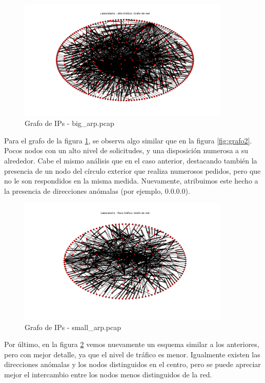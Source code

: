 \begin{figure}[H]
  \centering
    \includegraphics[width=0.9\textwidth]{graficos/grafoLaboBig.png}
    \caption{Grafo de IPs - big\_arp.pcap}
    \label{fig:grafo3}
\end{figure}

Para el grafo de la figura \ref{fig:grafo3}, se observa algo similar que en la figura \ref{fig:grafo2}. Pocos nodos con un alto nivel de solicitudes, y una disposición numerosa a su alrededor. Cabe el mismo análisis que en el caso anterior, destacando también la presencia de un nodo del círculo exterior que realiza numerosos pedidos, pero que no le son respondidos en la misma medida. Nuevamente, atribuimos este hecho a la presencia de direcciones anómalas (por ejemplo, 0.0.0.0).

\begin{figure}[H]
  \centering
    \includegraphics[width=0.9\textwidth]{graficos/grafoLaboSmall.png}
    \caption{Grafo de IPs - small\_arp.pcap}
    \label{fig:grafo4}
\end{figure}

Por último, en la figura \ref{fig:grafo4} vemos nuevamente un esquema similar a los anteriores, pero con mejor detalle, ya que el nivel de tráfico es menor. Igualmente existen las direcciones anómalas y los nodos distinguidos en el centro, pero se puede apreciar mejor el intercambio entre los nodos menos distinguidos de la red.

